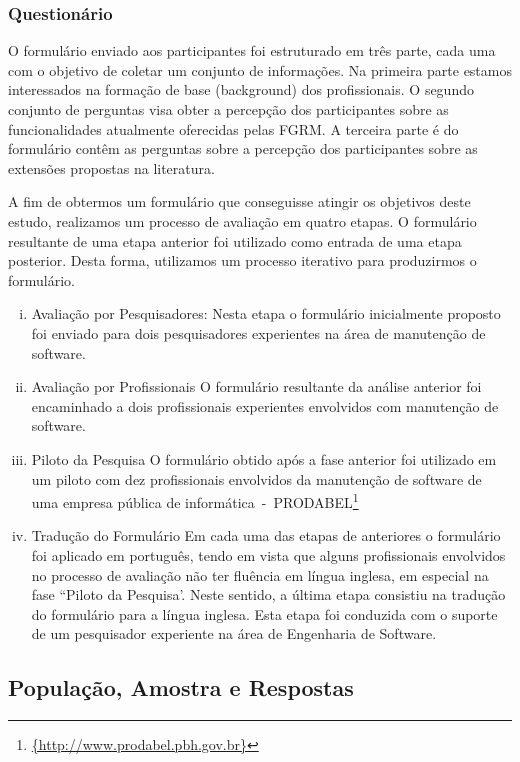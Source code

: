 \subsubsection{Questionário}
\label{subsec:questionario}

O formulário enviado aos participantes foi estruturado em três parte, cada uma
com o objetivo de coletar um conjunto de informações. Na primeira parte estamos
interessados na formação de base (background) dos profissionais. O segundo
conjunto de perguntas visa obter a percepção dos participantes sobre as
funcionalidades atualmente oferecidas pelas FGRM\@. A terceira parte é do
formulário contêm as perguntas sobre a percepção dos participantes sobre as
extensões propostas na literatura. 

A fim de obtermos um formulário que conseguisse atingir os objetivos deste
estudo, realizamos um processo de avaliação em quatro etapas. O formulário
resultante de uma etapa anterior foi utilizado como entrada de uma etapa
posterior. Desta forma, utilizamos um processo iterativo para produzirmos o
formulário.
\begin{enumerate}[(i)]
	\item Avaliação por Pesquisadores: Nesta etapa o formulário inicialmente
		proposto foi enviado para dois pesquisadores experientes na área de
		manutenção de software.
	\item Avaliação por Profissionais O formulário resultante da análise
		anterior foi encaminhado a dois profissionais experientes envolvidos com
		manutenção de software. 
	\item Piloto da Pesquisa O formulário obtido após a fase anterior foi
		utilizado em um piloto com
		dez profissionais envolvidos da manutenção de software de uma empresa
		pública de
		informática~-~PRODABEL\footnote{\url{{http://www.prodabel.pbh.gov.br}}}
	\item Tradução do Formulário Em cada uma das etapas de anteriores o
		formulário foi aplicado em
		português, tendo em vista que alguns profissionais envolvidos no
		processo de avaliação não
		ter fluência em língua inglesa, em especial na fase ``Piloto da
		Pesquisa'. Neste sentido, a última etapa  consistiu na tradução do
		formulário para a língua inglesa.  Esta etapa foi conduzida com  o
		suporte de um pesquisador experiente na área de Engenharia de Software.	
\end{enumerate}

\subsection{População, Amostra e Respostas}
\label{subsec:populacao_amostra_respostas}

